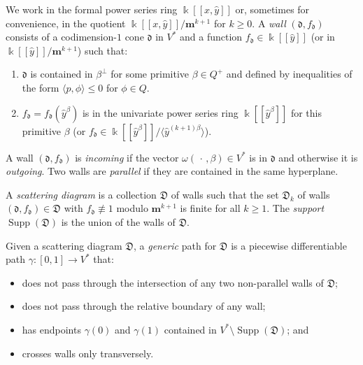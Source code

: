 \documentclass[ALCO,ThmDefs,Unicode,epreuves]{cedram}
\DeclareMathOperator{\Supp}{Supp}
\newcommand{\newword}[1]{\emph{#1}}
\newcommand\llbracket{[\![}
\newcommand\rrbracket{]\!]}
\newcommand{\br}[1]{{\langle #1 \rangle}}
\newcommand{\D}{{\mathfrak D}}
\newcommand{\m}{\mathbf{m}}
\renewcommand{\k}{\Bbbk}
\renewcommand{\d}{{\mathfrak d}}
\newcommand{\hy}{\hat{y}}
\begin{document}
We work in the formal power series ring $\k\llbracket x,\hy\rrbracket $ or, sometimes for convenience, in the quotient $\k\llbracket x,\hy\rrbracket /\m^{k+1}$ for $k\ge 0$.
A \newword{wall} $(\d,f_\d)$ consists of a codimension-$1$ cone $\d$ in $V^*$ and a function $f_\d\in\k\llbracket \hy\rrbracket $ (or in $\k\llbracket \hy\rrbracket /\m^{k+1}$) such that:
\begin{enumerate}[label=(\roman*)]%
\item $\d$ is contained in $\beta^\perp$ for some primitive $\beta\in Q^+$ and defined by inequalities of the form $\br{p,\phi}\le0$ for $\phi\in Q$.
\item $f_\d=f_\d(\hy^\beta)$ is in the univariate power series ring $\k\llbracket \hy^\beta\rrbracket $ for this primitive $\beta$ (or $f_\d\in\k\llbracket \hy^\beta\rrbracket /\br{\hy^{(k+1)\beta}}$).
\end{enumerate}
A wall $(\d,f_\d)$ is \newword{incoming} if the vector $\omega(\,\cdot\,,\beta)\in V^*$ is in $\d$ and otherwise it is \newword{outgoing}.
Two walls are \newword{parallel} if they are contained in the same hyperplane.

A \newword{scattering diagram} is a collection $\D$ of walls such that the set $\D_k$ of walls $(\d,f_\d)\in\D$ with $f_\d\not\equiv 1$ modulo $\m^{k+1}$ is finite for all $k\ge 1$.
The \newword{support} $\Supp(\D)$ is the union of the walls of $\D$.

Given a scattering diagram $\D$, a \newword{generic} path for $\D$ is a piecewise differentiable path $\gamma:[0,1]\to V^*$ that:
\begin{itemize}
\item does not pass through the intersection of any two non-parallel walls of $\D$;
\item does not pass through the relative boundary of any wall;
\item has endpoints $\gamma(0)$ and $\gamma(1)$ contained in $V^*\setminus\Supp(\D)$; and
\item crosses walls only transversely.
\end{itemize}
\end{document}
